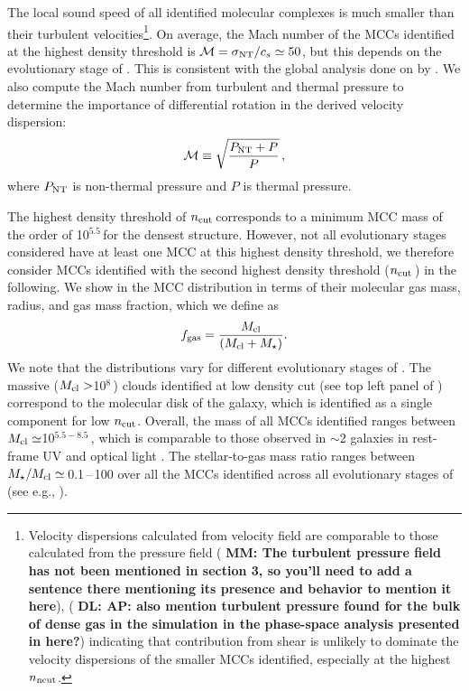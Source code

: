 \IfFileExists{emulateapjlegacy.cls}{\documentclass[iop]{emulateapjlegacy}}{\documentclass[iop]{emulateapj}}
\newcommand{\DL}[1]{({\bf \color{dlcolor} DL: #1})}
\newcommand{\MM}[1]{({\bf \color{mmcolor} MM: #1})}
\begin{document}
The local sound speed of all identified molecular complexes is much
smaller than their turbulent velocities\footnote{Velocity dispersions
  calculated from velocity field are comparable to those calculated
  from the pressure field 
    \MM{The turbulent pressure field has not been
    mentioned in section 3, so you'll need to add a sentence there
    mentioning its presence and behavior to mention it here}, 
    \DL{AP: also mention turbulent pressure found for the bulk of dense gas in the simulation in the phase-space analysis presented in \citet{Pallottini17a} here?}
indicating that contribution from shear is unlikely to dominate the velocity dispersions of the smaller MCCs identified, especially 
at the highest $n_{\rm ncut}$.\label{ftn:veldisp}}. 
On average, the Mach number of the MCCs identified at the highest density threshold is $\mathcal{M} = \sigma_{\rm NT}/c_s\simeq 50$, 
but this depends on the evolutionary stage of \flower.  %
This is consistent with the global analysis done on \flower by \citet{Vallini18a}.
We also compute the Mach number from turbulent and thermal pressure to determine the importance of 
differential rotation in the derived velocity dispersion: 
\begin{equation}
\mathcal{M} \equiv \sqrt{\frac{P_{\rm NT} + P}{ P }}\,,
\label{eqn:MPress}
\end{equation}
where $P_{\rm NT}$ is non-thermal pressure and $P$ is thermal pressure.


The highest density threshold of $n_{\rm cut}$\,\cc corresponds to 
a minimum MCC mass of the order of 10$^{5.5}$\,\Msun for the densest structure.
However, not all evolutionary stages considered have at least one MCC at this highest density threshold, 
we therefore consider MCCs identified with the second highest density threshold ($n_{\rm cut}$\,\cc) in the following. 
We show in  the MCC distribution in terms of their molecular gas mass, radius, and gas mass fraction, which we define as
\begin{equation}
f_{\rm gas} = \frac{M_{\rm cl}} {\left(M_{\rm cl} + M_\star\right)}.
\end{equation}
%
We note that the distributions vary for different evolutionary stages of \flower. 
%
The massive ($M_{\rm cl}>$10$^8$\,\Msun) 
clouds identified at low density cut (see top left panel of )  
correspond to the molecular disk of the
galaxy, which is identified as a single component for low $n_{\rm
  cut}$. Overall, the mass of all MCCs identified ranges between $M_{\rm
  cl}\simeq$10$^{5.5-8.5}$\,\Msun, which is comparable to those observed in
\z$\sim$2 galaxies in rest-frame UV and optical light
\citep{Elmegreen07a, Elmegreen09a}. The stellar-to-gas mass ratio ranges between $M_{\star}/M_{\rm cl} \simeq$\,0.1\,--\,100 over all the
MCCs identified across all evolutionary stages of \flower (see e.g., ).
\end{document}
